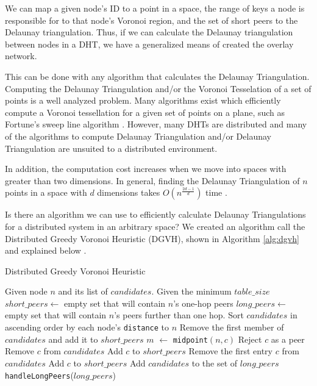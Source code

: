 \documentclass[11pt,conference]{IEEEtran}
\begin{document}
We can map a given node's ID to a point in a space, the range of keys a node is responsible for to that node's Voronoi region, and the set of short peers to the Delaunay triangulation.
Thus, if we can calculate the Delaunay triangulation between nodes in a DHT, we have a generalized means of created the overlay network.

This can be done with any algorithm that calculates the Delaunay Triangulation.
Computing the Delaunay Triangulation and/or the Voronoi Tesselation of a set of points is a well analyzed problem.
Many algorithms exist which efficiently compute a Voronoi tessellation for a given set of points on a plane, such as Fortune's sweep line algorithm \cite{fortune1987sweepline}.
However, many DHTs are distributed and many of the algorithms to compute Delaunay Triangulation and/or Delaunay Triangulation are unsuited to a distributed environment.

In addition, the computation cost increases when we move into spaces with greater than two dimensions.
In general, finding the Delaunay Triangulation of $n$ points in a space with $d$ dimensions takes $O(n^{\frac{2d-1}{d}})$ time \cite{watson1981computing}.


Is there an algorithm we can use to efficiently calculate Delaunay Triangulations for a distributed system in an arbitrary space?
We created an algorithm call the Distributed Greedy Voronoi Heuristic (DGVH), shown in Algorithm \ref{alg:dgvh} and explained below \cite{dgvh}.


\begin{algorithm} %
	\caption{Distributed Greedy Voronoi Heuristic}
	\label{alg:dgvh}
	\begin{algorithmic}[1]  %
		\STATE Given node $n$ and its list of $candidates$.
		\STATE Given the minimum $table\_size$
		\STATE $short\_peers \leftarrow$ empty set that will contain $n$'s one-hop peers
		\STATE $long\_peers \leftarrow$ empty set that will contain $n$'s peers further than one hop.
		\STATE Sort $candidates$ in ascending order by each node's \texttt{distance} to $n$
		\STATE Remove the first member of $candidates$ and add it to $short\_peers$
			\STATE $m$ $ \leftarrow $ \texttt{midpoint}$( n, c )$
				\STATE Reject $c$ as a peer
			\ELSE
				\STATE Remove $c$ from $candidates$
				\STATE Add $c$ to $short\_peers$
			\ENDIF
		\ENDFOR
			\STATE Remove the first entry $c$ from $candidates$
			\STATE Add $c$ to $short\_peers$
		\ENDWHILE
		\STATE Add $candidates$ to the set of $long\_peers$	
		\STATE \texttt{handleLongPeers}($long\_peers$)
	\end{algorithmic}
\end{algorithm} 
\end{document}
